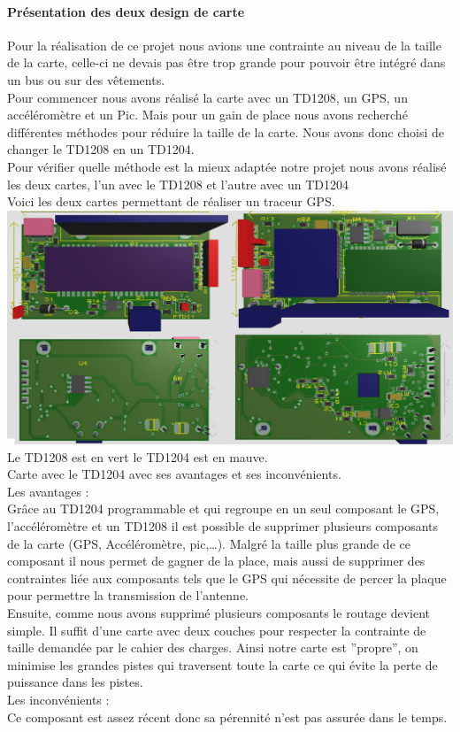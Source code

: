 \documentclass[10pt,a4paper]{article}
\begin{document}
\paragraph{Présentation des deux design de carte}
Pour la réalisation de ce projet nous avions une contrainte au niveau de la taille de la carte, celle-ci ne devais pas être trop grande pour pouvoir être intégré dans un bus ou sur des vêtements.\\
Pour commencer nous avons réalisé la carte avec un TD1208, un GPS, un accéléromètre et un Pic.
Mais pour un gain de place nous avons recherché différentes méthodes pour réduire la taille de la carte. Nous avons donc choisi de changer le TD1208 en un TD1204.\\ 
 Pour vérifier quelle méthode est la mieux adaptée notre projet nous avons réalisé les deux cartes, l'un avec le TD1208 et l'autre avec un TD1204\\ Voici les deux cartes permettant de réaliser un traceur GPS.\\ 
 \includegraphics[scale=0.2]{TP1204-1208.png} 
\\Le TD1208 est en vert le TD1204 est en mauve.  
 \\Carte avec le TD1204 avec ses avantages et ses inconvénients. \\Les avantages : \\Grâce au TD1204 programmable et qui regroupe en un seul composant le GPS, l'accéléromètre et un TD1208 il est possible de supprimer plusieurs composants de la carte (GPS, Accéléromètre, pic,…). Malgré la taille plus grande de ce composant il nous permet de gagner de la place, mais aussi de supprimer des contraintes liée aux composants tels que le GPS qui nécessite de percer la plaque pour permettre la transmission de l'antenne. \\Ensuite, comme nous avons supprimé plusieurs composants le routage devient simple. Il suffit d'une carte avec deux couches pour respecter la contrainte de taille demandée par le cahier des charges. Ainsi notre carte est  ''propre'', on minimise les grandes pistes qui traversent toute la carte ce qui évite la perte de puissance dans les pistes.\\Les inconvénients :\\Ce composant est assez récent donc sa pérennité n'est pas assurée dans le temps.  
\end{document}
